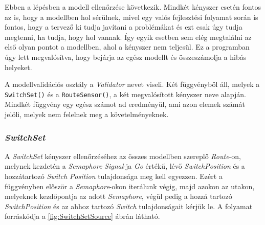 Ebben a lépésben a modell ellenőrzése következik. Mindkét kényszer esetén fontos az is, hogy a modellben hol sérülnek, mivel egy valós fejlesztési folyamat során is fontos, hogy a tervező ki tudja javítani a problémákat és ezt csak úgy tudja megtenni, ha tudja, hogy hol vannak. Így egyik esetben sem elég megtalálni az első olyan pontot a modellben, ahol a kényszer nem teljesül. Ez a programban úgy lett megvalósítva, hogy bejárja az egész modellt és összeszámolja a hibás helyeket.

A modellvalidációs osztály a \emph{Validator} nevet viseli. Két függvényből áll, melyek a \texttt{SwitchSet()} és a \texttt{RouteSensor()}, a két megvalósított kényszer neve alapján. Mindkét függvény egy egész számot ad eredményül, ami azon elemek számát jelöli, melyek nem felelnek meg a követelményeknek. 

\subsubsection{\emph{SwitchSet}}

A \emph{SwitchSet} kényszer ellenőrzéséhez az összes modellben szereplő \emph{Route}-on, melynek kezdetén a \emph{Semaphore} \emph{Signal}-ja \emph{Go} értékű, lévő \emph{SwitchPosition} és a hozzátartozó \emph{Switch} \emph{Position} tulajdonsága meg kell egyezzen. Ezért a függvényben először a \emph{Semaphore}-okon iterálunk végig, majd azokon az utakon, melyeknek kezdőpontja az adott \emph{Semaphore}, végül pedig a hozzá tartozó \emph{SwitchPosition} és az ahhoz tartozó \emph{Switch} tulajdonságait kérjük le. A folyamat forráskódja a \ref{fig:SwitchSetSource} ábrán látható.

